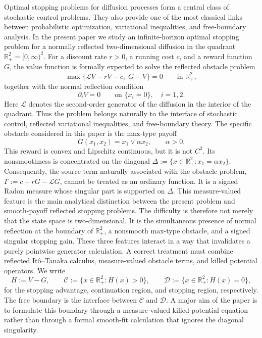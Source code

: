 \documentclass[pdflatex,sn-mathphys-num]{sn-jnl}
\theoremstyle{plain}
\theoremstyle{definition}
\theoremstyle{remark}
\numberwithin{equation}{section}
\begin{document}
Optimal stopping problems for diffusion processes form a central class of stochastic control problems. They also provide one of the most classical links between probabilistic optimization, variational inequalities, and free-boundary analysis. In the present paper we study an infinite-horizon optimal stopping problem for a normally reflected two-dimensional diffusion in the quadrant $\mathbb R_+^2=[0,\infty)^2$. For a discount rate \(r>0\), a running cost \(c\), and a reward function \(G\), the value function is formally expected to solve the reflected obstacle problem 
\[
\max\big\{\mathcal L V-rV-c,\;G-V\big\}=0 \qquad \text{in }\mathbb R_+^2,\]
together with the normal reflection condition 
\[
\partial_i V=0 \qquad \text{on } \{x_i=0\},\quad i=1,2 . 
\]
Here \(\mathcal L\) denotes the second-order generator of the diffusion in the interior of the quadrant. Thus the problem belongs naturally to the interface of stochastic control, reflected variational inequalities, and free-boundary theory. The specific obstacle considered in this paper is the max-type payoff \begin{equation} \label{eq:intro-payoff} G(x_1,x_2)=x_1\vee \alpha x_2,\qquad \alpha>0 . \end{equation} This reward is convex and Lipschitz continuous, but it is not \(C^2\). Its nonsmoothness is concentrated on the diagonal 
$\Delta:=\{x\in\mathbb R_+^2:x_1=\alpha x_2\}$. 
Consequently, the source term naturally associated with the obstacle problem, 
$\Gamma:=c+rG-\mathcal L G$,
cannot be treated as an ordinary function. It is a signed Radon measure whose singular part is supported on \(\Delta\). This measure-valued feature is the main analytical distinction between the present problem and smooth-payoff reflected stopping problems. The difficulty is therefore not merely that the state space is two-dimensional. It is the simultaneous presence of normal reflection at the boundary of \(\mathbb R_+^2\), a nonsmooth max-type obstacle, and a signed singular stopping gain. These three features interact in a way that invalidates a purely pointwise generator calculation. A correct treatment must combine reflected It\^{o}--Tanaka calculus, measure-valued obstacle terms, and killed potential operators. We write \[ H:=V-G,\qquad \mathcal C:=\{x\in\mathbb R_+^2:H(x)>0\},\qquad \mathcal D:=\{x\in\mathbb R_+^2:H(x)=0\}, \] for the stopping advantage, continuation region, and stopping region, respectively. The free boundary is the interface between \(\mathcal C\) and \(\mathcal D\). A major aim of the paper is to formulate this boundary through a measure-valued killed-potential equation rather than through a formal smooth-fit calculation that ignores the diagonal singularity. 
\end{document}
